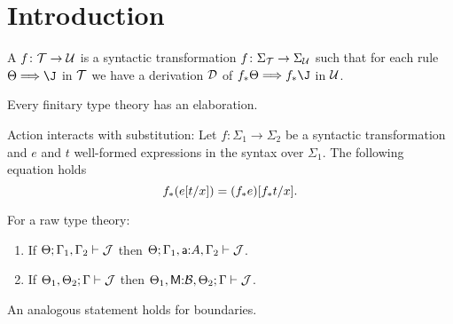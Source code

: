\chapter{Introduction}

\begin{definition}
    A  $f \colon \mathcal{T} \to \mathcal{U}$ is a syntactic transformation $f \colon \Sigma_{\mathcal{T}} \to \Sigma_{\mathcal{U}}$ such that for each rule $\rawRule{\Theta}{\J}$ in $\mathcal{T}$ we have a derivation $\mathcal{D}$ of $\rawRule{\act{f} \Theta}{\act{f}\J}$ in $\mathcal{U}$.
\end{definition}

\begin{theorem}
    Every finitary type theory has an elaboration.
\end{theorem}

\begin{lemma}
    Action interacts with substitution:
    Let $f \colon \Sigma_1 \to \Sigma_2$ be a syntactic transformation and $e$ and $t$ well-formed expressions in the syntax over $\Sigma_1$. The following equation holds
    \begin{equation*}
        f_*(e[t/x]) = (f_*e)[f_*t/x].
    \end{equation*}
\end{lemma}

  \begin{proposition}[Weakening]
    For a raw type theory:
    \begin{enumerate}
    \item If $\Theta; \Gamma_1, \Gamma_2 \vdash \mathcal{J}$ then $\Theta; \Gamma_1, \mathsf{a} {:} A, \Gamma_2 \vdash \mathcal{J}$.
    \item If $\Theta_1, \Theta_2; \Gamma \vdash \mathcal{J}$ then $\Theta_1, \mathsf{M} {:} \mathcal{B}, \Theta_2; \Gamma \vdash \mathcal{J}$.
    \end{enumerate}
    An analogous statement holds for boundaries.
  \end{proposition}

